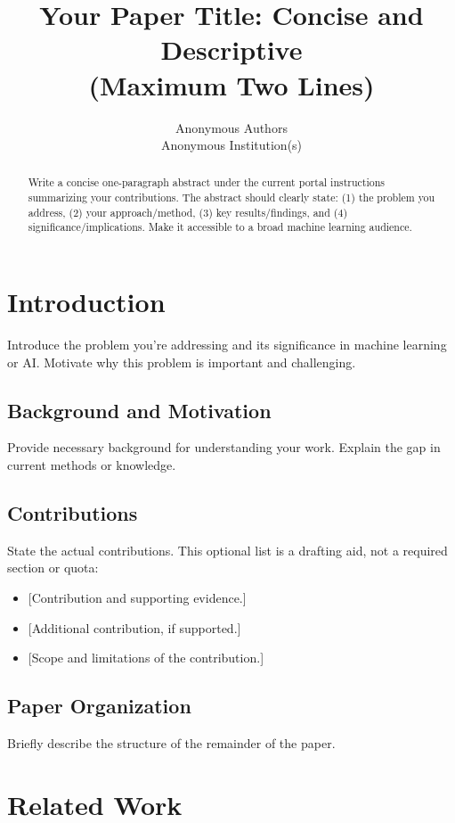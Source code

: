 \documentclass{article}
\title{Your Paper Title: Concise and Descriptive \\ (Maximum Two Lines)}
\author{
  Anonymous Authors \\
  Anonymous Institution(s) \\
}
\begin{document}
\maketitle

\begin{abstract}
Write a concise one-paragraph abstract under the current portal instructions summarizing your contributions. The abstract should clearly state: (1) the problem you address, (2) your approach/method, (3) key results/findings, and (4) significance/implications. Make it accessible to a broad machine learning audience.
\end{abstract}

\section{Introduction}
\label{sec:introduction}

Introduce the problem you're addressing and its significance in machine learning or AI. Motivate why this problem is important and challenging.

\subsection{Background and Motivation}
Provide necessary background for understanding your work. Explain the gap in current methods or knowledge.

\subsection{Contributions}
State the actual contributions. This optional list is a drafting aid, not a required section or quota:
\begin{itemize}
    \item {[Contribution and supporting evidence.]}
    \item {[Additional contribution, if supported.]}
    \item {[Scope and limitations of the contribution.]}
\end{itemize}

\subsection{Paper Organization}
Briefly describe the structure of the remainder of the paper.

\section{Related Work}
\label{sec:related}
\end{document}
